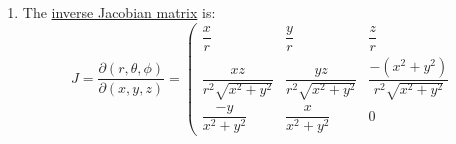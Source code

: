 \documentclass[12pt,a4]{article}
\newcommand{\e}{\mathrm{d}}
\begin{document}
\begin{enumerate}
\begin{enumerate}
\begin{align*}
        \end{align*}
        Now $\sqrt{g} = r^2 \sin \theta$ and $g^{\theta \theta} = -\frac{1}{r^2}$ and $g^{\phi\phi} = -\frac{1}{r^2 \sin^2\theta }$.
        Therefore $\tensor{\epsilon}{^\theta ^\phi_t_r} = \sqrt{g} g^{\theta\theta} g^{\phi\phi} \sigma_{\theta\phi t r}$ and:
        \begin{align*}
          \e * F^{(4)} &= \e \left(\frac{Q}{r^2} \e t \wedge \e r\right)\\
                       &= 0 
        \end{align*}
        Since the coefficient only has $r$ dependence, and taking the derivative of this gives the differential $\e r$ which will make the whole term zero when wedged with $\e r$.
      \item
        The \href{https://en.wikipedia.org/wiki/Spherical_coordinate_system}{inverse Jacobian matrix} is:
        \begin{equation*}
          J = \frac{\partial(r, \theta, \phi)}{\partial (x, y, z)} =
          \left(
          \begin{matrix}
            \dfrac{x}{r}&\dfrac{y}{r}&\dfrac{z}{r}\\
            \dfrac{xz}{r^2\sqrt{x^2+y^2}}&\dfrac{yz}{r^2\sqrt{x^2+y^2}}&\dfrac{-\left(x^2 + y^2\right)}{r^2\sqrt{x^2+y^2}}\\
            \dfrac{-y}{x^2+y^2}&\dfrac{x}{x^2+y^2}&0
          \end{matrix}

\end{equation*}
\end{enumerate}
\end{enumerate}
\end{document}
